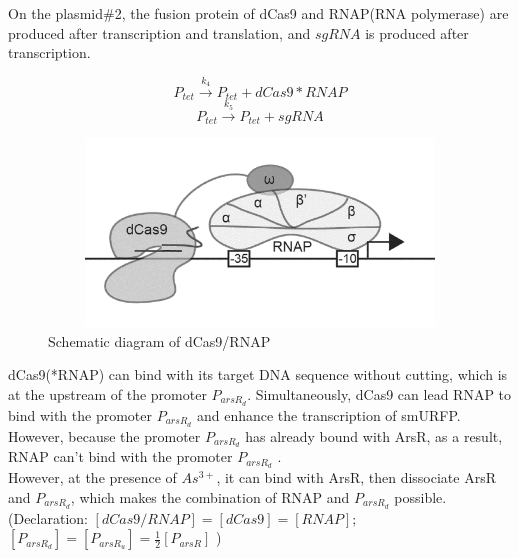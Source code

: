 On the plasmid\#2, the fusion protein of dCas9 and RNAP(RNA polymerase) are produced after transcription and translation, and $sgRNA$ is produced after transcription.

\begin{equation}
P_{tet} \stackrel{k_{4}}{\longrightarrow} P_{tet} +dCas9*RNAP
\end{equation}
\begin{equation}
P_{tet} \stackrel{k_{5}}{\longrightarrow} P_{tet} +sgRNA
\end{equation}

\begin{figure}[h]
	\centering
	\includegraphics[width=12cm,height=5cm]{2}
	\caption{Schematic diagram of dCas9/RNAP}
\end{figure}

dCas9(*RNAP) can bind with its target DNA sequence without cutting, which is at the upstream of the promoter $P_{arsR_d}$. Simultaneously, dCas9 can lead RNAP to bind with the promoter $P_{arsR_d}$ and enhance the transcription of smURFP. However, because the promoter $P_{arsR_d}$ has already bound with ArsR, as a result, RNAP can't bind with the promoter $P_{arsR_d}$ .\cite{bikard2013programmable} \\ 

However, at the presence of $As^{3+}$, it can bind with ArsR, then dissociate ArsR and $P_{arsR_d}$, which makes the combination of RNAP and $P_{arsR_d}$ possible. \\

(Declaration: $[dCas9/RNAP] = [dCas9] = [RNAP]$;\\ $[P_{arsR_d}]=[P_{arsR_u}] = \frac{1}{2}[P_{arsR}]$ )


